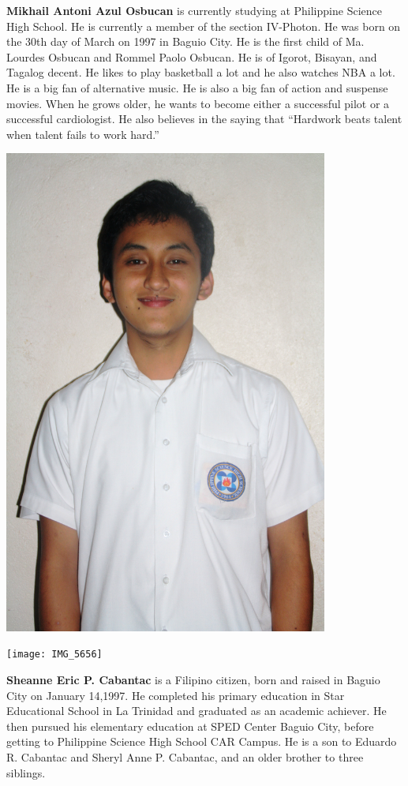 \noindent
\begin{minipage}{0.68\textwidth}
\textbf{Mikhail Antoni Azul Osbucan} is currently studying at Philippine Science High School. He is currently a member of  the section IV-Photon. He was born on the 30th day of March on 1997 in Baguio City. He is the first child of Ma. Lourdes Osbucan and Rommel Paolo Osbucan. He is of Igorot, Bisayan, and Tagalog decent. He likes to play basketball a lot and he also watches NBA a lot. He is a big fan of alternative music. He is also a big fan of action and suspense movies. When he grows older, he wants to become either a successful pilot or a successful cardiologist. He also believes in the saying that “Hardwork beats talent when talent fails to work hard.” 
\end{minipage}\hfill
\begin{minipage}{0.3\textwidth}\raggedleft
\includegraphics[width=0.8\textwidth]{IMG_5287}
\end{minipage}

\vfill

\noindent
\begin{minipage}{0.3\textwidth}
\texttt{[image: IMG\_5656]}
\end{minipage}\hfill
\begin{minipage}{0.68\textwidth}
\textbf{Sheanne Eric P. Cabantac} is a Filipino citizen, born and raised in Baguio City on January 14,1997. He completed his primary education in Star Educational School in La Trinidad and graduated as an academic achiever. He then pursued his elementary education at SPED Center Baguio City, before getting to Philippine Science High School CAR Campus. He is a son to Eduardo R. Cabantac and Sheryl Anne P. Cabantac, and an older brother to three siblings.
\end{minipage}